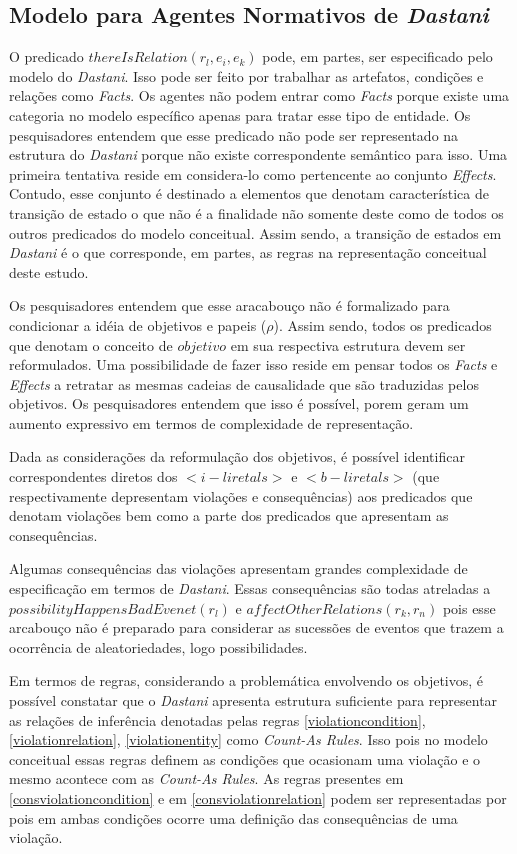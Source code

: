 \subsection{Modelo para Agentes Normativos de \textit{Dastani}}

O predicado $thereIsRelation(r_l,e_i,e_k)$ pode, em partes, ser especificado pelo modelo do \textit{Dastani}. Isso pode ser feito por trabalhar as artefatos, condições e relações como \textit{Facts}. Os agentes não podem entrar como \textit{Facts} porque existe uma categoria no modelo específico apenas para tratar esse tipo de entidade. Os pesquisadores entendem que esse predicado não pode ser representado na estrutura do \textit{Dastani} porque não existe correspondente semântico para isso. Uma primeira tentativa reside em considera-lo como pertencente ao conjunto \textit{Effects}. Contudo, esse conjunto é destinado a elementos que denotam característica 
de transição de estado o que não é a finalidade não somente deste como de todos os outros predicados do modelo conceitual. Assim sendo, a transição de estados em  \textit{Dastani} é o que corresponde, em partes, as regras na representação conceitual deste estudo. 

Os pesquisadores entendem que esse aracabouço não é formalizado para condicionar a idéia de objetivos e papeis ($\rho$). Assim sendo, todos os predicados que denotam o conceito de $objetivo$ em sua respectiva estrutura devem ser reformulados. Uma possibilidade de fazer isso reside em pensar todos os \textit{Facts} e \textit{Effects} a retratar as mesmas cadeias de causalidade que são traduzidas pelos objetivos. Os pesquisadores entendem que isso é possível, porem geram um aumento expressivo em termos de complexidade de representação. 

Dada as considerações da reformulação dos objetivos, é possível identificar correspondentes diretos dos $<i-liretals>$  e $<b-liretals>$ (que respectivamente depresentam violações e consequências) aos predicados que denotam violações bem como a parte dos predicados que apresentam as consequências. 

Algumas consequências das violações apresentam grandes complexidade de especificação em termos de \textit{Dastani}. Essas consequências são todas atreladas a $possibilityHappensBadEvenet(r_l)$ e $affectOtherRelations(r_k,r_n)$ pois esse arcabouço não é preparado para considerar as sucessões de eventos que trazem a ocorrência de aleatoriedades, logo possibilidades. 

Em termos de regras, considerando a problemática envolvendo os objetivos, é possível constatar que o \textit{Dastani} apresenta estrutura suficiente para representar as relações de inferência denotadas pelas regras \ref{violationcondition}, \ref{violationrelation}, \ref{violationentity} como \textit{Count-As Rules}. Isso pois no modelo conceitual essas regras definem as condições que ocasionam uma violação e o mesmo acontece com as \textit{Count-As Rules}. As regras presentes em \ref{consviolationcondition} e em \ref{consviolationrelation} podem ser representadas por  pois em ambas condições ocorre uma definição das consequências de uma violação. 